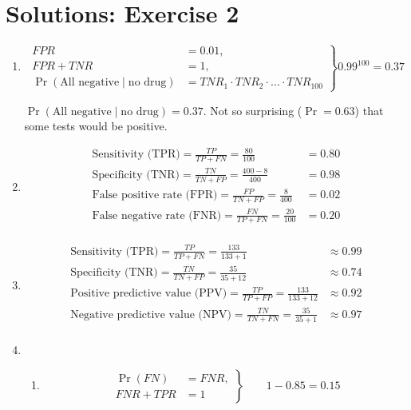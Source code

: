 \documentclass[12pt,a4paper,twoside]{article}
\begin{document}
\section*{Solutions: Exercise 2}

\begin{enumerate}[label=\bfseries Q\arabic*.]
\item %
  \begin{equation*}
    \left.\begin{aligned}
        FPR &= 0.01, \\
        FPR + TNR &= 1,\\
        \Pr(\text{All negative} \mid \text{no drug}) &= TNR_{1} \cdot TNR_{2} \cdot
        ...  \cdot TNR_{100}
      \end{aligned}
    \right\}
    0.99^{100} = 0.37
  \end{equation*}      
  

  $\Pr(\text{All negative} \mid \text{no drug}) = 0.37$.  Not so
  surprising ($\Pr=0.63$) that some tests would be positive.

\item %
  \begin{align*}
    \text{Sensitivity (TPR)} = \frac{TP}{TP+FN} = \frac{80}{100} &= 0.80 \\
    \text{Specificity (TNR)} = \frac{TN}{TN+FP} = \frac{400-8}{400} &= 0.98 \\
    \text{False positive rate (FPR)} = \frac{FP}{TN+FP} = \frac{8}{400} &= 0.02 \\
    \text{False negative rate (FNR)} = \frac{FN}{TP+FN} = \frac{20}{100} &= 0.20 \\
  \end{align*}

\item %
  \begin{align*}
    \text{Sensitivity (TPR)} = \frac{TP}{TP+FN} = \frac{133}{133+1} &\approx 0.99 \\
    \text{Specificity (TNR)} = \frac{TN}{TN+FP} = \frac{35}{35+12} &\approx 0.74 \\
    \text{Positive predictive value (PPV)} = \frac{TP}{TP+FP} = \frac{133}{133+12} &\approx 0.92 \\
    \text{Negative predictive value (NPV)} = \frac{TN}{TN+FN} = \frac{35}{35+1} &\approx 0.97 \\
  \end{align*}

\item %
  \begin{enumerate}
  \item %
    \begin{equation*}
      \left.\begin{aligned}
          \Pr(FN) &= FNR,\\
          FNR + TPR &= 1
        \end{aligned}
      \right\}
      \qquad 1-0.85 = 0.15
    \end{equation*}      
    

\end{enumerate}
\end{enumerate}
\end{document}
